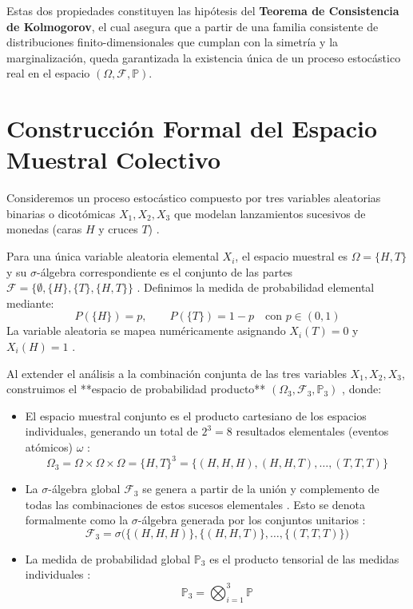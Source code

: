 Estas dos propiedades constituyen las hipótesis del \textbf{Teorema de Consistencia de Kolmogorov}, el cual asegura que a partir de una familia consistente de distribuciones finito-dimensionales que cumplan con la simetría y la marginalización, queda garantizada la existencia única de un proceso estocástico real en el espacio $(\Omega, \mathcal{F}, \mathbb{P})$.

\section{Construcción Formal del Espacio Muestral Colectivo}

Consideremos un proceso estocástico compuesto por tres variables aleatorias binarias o dicotómicas $X_1, X_2, X_3$ que modelan lanzamientos sucesivos de monedas (caras $H$ y cruces $T$) . 

Para una única variable aleatoria elemental $X_i$, el espacio muestral es $\Omega = \{H, T\}$  y su $\sigma$-álgebra correspondiente es el conjunto de las partes $\mathcal{F} = \{\emptyset, \{H\}, \{T\}, \{H, T\}\}$ . Definimos la medida de probabilidad elemental mediante:
\begin{equation}
    P(\{H\}) = p, \qquad P(\{T\}) = 1 - p \quad \text{con } p \in (0,1) 
\end{equation}
La variable aleatoria se mapea numéricamente asignando $X_i(T) = 0$ y $X_i(H) = 1$ .

Al extender el análisis a la combinación conjunta de las tres variables $X_1, X_2, X_3$, construimos el **espacio de probabilidad producto** $(\Omega_3, \mathcal{F}_3, \mathbb{P}_3)$ , donde:
\begin{itemize}
    \item El espacio muestral conjunto es el producto cartesiano de los espacios individuales, generando un total de $2^3 = 8$ resultados elementales (eventos atómicos) $\omega$ :
    \begin{equation}
        \Omega_3 = \Omega \times \Omega \times \Omega = \{H, T\}^3 = \{(H,H,H), (H,H,T), \dots, (T,T,T)\} 
    \end{equation}
    \item La $\sigma$-álgebra global $\mathcal{F}_3$ se genera a partir de la unión y complemento de todas las combinaciones de estos sucesos elementales . Esto se denota formalmente como la $\sigma$-álgebra generada por los conjuntos unitarios :
    \begin{equation}
        \mathcal{F}_3 = \sigma\big( \{(H,H,H)\}, \{(H,H,T)\}, \dots, \{(T,T,T)\} \big) 
    \end{equation}
    \item La medida de probabilidad global $\mathbb{P}_3$ es el producto tensorial de las medidas individuales :
    \begin{equation}
        \mathbb{P}_3 = \bigotimes_{i=1}^3 \mathbb{P} 
    \end{equation}
\end{itemize}

